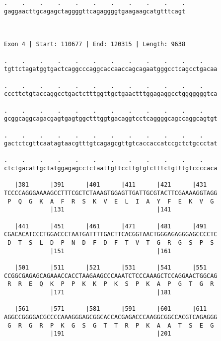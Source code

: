 \documentclass{article}
\begin{document}
\begin{Verbatim}
.    .    .    .    .    .    .    .    .    .    .
gaggaacttgcagagctaggggttcagaggggtgaagaagcatgtttcagt
                                                   
                                                   
 
Exon 4 | Start: 110677 | End: 120315 | Length: 9638
 
.    .    .    .    .    .    .    .    .    .    .    .    
tgttctagatggtgactcaggcccaggcaccaaccagcagaatgggcctcagcctgacaa
                                                            
.    .    .    .    .    .    .    .    .    .    .    .    
cccttctgtaccaggcctgactctttggttgctgaactttggagaggcctgggggggtca
                                                            
.    .    .    .    .    .    .    .    .    .    .    .    
gcggcaggcagacgagtgagtggctttggtgacaggtcctcaggggcagccaggcagtgt
                                                            
.    .    .    .    .    .    .    .    .    .    .    .    
gactctcgttcaatagtaacgtttgtcagagcgttgtcaccaccatccgctctgccctat
                                                            
.    .    .    .    .    .    .    .    .    .    .    .    
ctctgacattgctatggagagcctctaattgttccttgtgtctttctgtttgtccccaca
                                                            
   |381      |391      |401      |411      |421      |431   
TCCCCAGGGAAAAGCCTTTCGCTCTAAAGTGGAGTTGATTGCGTACTTCGAAAAGGTAGG
 P  Q  G  K  A  F  R  S  K  V  E  L  I  A  Y  F  E  K  V  G 
             |131                          |141             
  
   |441      |451      |461      |471      |481      |491   
CGACACATCCCTGGACCCTAATGATTTTGACTTCACGGTAACTGGGAGAGGGAGCCCCTC
 D  T  S  L  D  P  N  D  F  D  F  T  V  T  G  R  G  S  P  S 
             |151                          |161             
  
   |501      |511      |521      |531      |541      |551   
CCGGCGAGAGCAGAAACCACCTAAGAAGCCCAAATCTCCCAAAGCTCCAGGAACTGGCAG
 R  R  E  Q  K  P  P  K  K  P  K  S  P  K  A  P  G  T  G  R 
             |171                          |181             
  
   |561      |571      |581      |591      |601      |611   
AGGCCGGGGACGCCCCAAAGGGAGCGGCACCACGAGACCCAAGGCGGCCACGTCAGAGGG
 G  R  G  R  P  K  G  S  G  T  T  R  P  K  A  A  T  S  E  G 
             |191                          |201             
  

\end{Verbatim}
\end{document}
